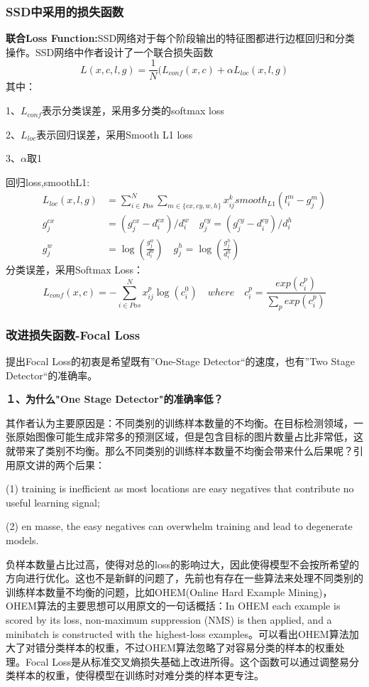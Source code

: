 \subsubsection{SSD中采用的损失函数}
\textbf{联合Loss Function:}SSD网络对于每个阶段输出的特征图都进行边框回归和分类操作。SSD网络中作者设计了一个联合损失函数
\begin{equation}
	L(x,c,l,g) = \frac{1}{N}(L_{conf}(x,c) + \alpha L_{loc}(x,l,g)
\end{equation}
其中：

 1、$L_{conf}$表示分类误差，采用多分类的softmax loss
 
 2、$L_{loc}$表示回归误差，采用Smooth L1 loss
 
 3、$\alpha$取1
 
回归loss,smoothL1:
\begin{align}
	L_{loc}(x,l,g) &= \sum _{i \in Pos} ^{N} \sum_{m \in \{cx,cy,w,h\}} x_{ij}^k smooth _{L1} (l_i ^m - g_j ^m) \\
	g_j^{cx} &= \left( g_j ^{cx} - d_i ^{cx} \right) / d_i ^w \quad g_j^{cy} = (g_j^{cy} - d_i^{cy}) / d_i ^h \\
	g_j^w &= \log(\frac{g_j^w}{d_i^w}) \quad g_j^h = \log(\frac{g_j^h}{d_i^h})
\end{align}	
分类误差，采用Softmax Loss：
\begin{equation}
L_{conf}(x, c) = -\sum_{i \in Pos}^N x_{ij}^p\log(c_i^0) \quad where \quad c_i^p = \frac{exp(c_i^p)}{\sum_{p}exp(c_i^p)} 
\end{equation}
\subsubsection{改进损失函数-Focal Loss}
提出Focal Loss的初衷是希望既有”One-Stage Detector“的速度，也有”Two Stage Detector“的准确率。

\textbf{１、为什么"One Stage Detector"的准确率低？}

其作者认为主要原因是：不同类别的训练样本数量的不均衡。在目标检测领域，一张原始图像可能生成非常多的预测区域，但是包含目标的图片数量占比非常低，这就带来了类别不均衡。那么不同类别的训练样本数量不均衡会带来什么后果呢？引用原文讲的两个后果：

(1) training is inefficient as most locations are easy negatives that contribute no useful learning signal; 

(2) en masse, the easy negatives can overwhelm training and lead to degenerate models. \cite{focal-loss}

负样本数量占比过高，使得对总的loss的影响过大，因此使得模型不会按所希望的方向进行优化。这也不是新鲜的问题了，先前也有存在一些算法来处理不同类别的训练样本数量不均衡的问题，比如OHEM(Online Hard Example Mining)\cite{ohem}，OHEM算法的主要思想可以用原文的一句话概括：In OHEM each example is scored by its loss, non-maximum suppression (NMS\cite{soft-nms}) is then applied, and a minibatch is constructed with the highest-loss examples。\cite{ohem}可以看出OHEM算法加大了对错分类样本的权重，不过OHEM算法忽略了对容易分类的样本的权重处理。Focal Loss是从标准交叉熵损失基础上改进所得。这个函数可以通过调整易分类样本的权重，使得模型在训练时对难分类的样本更专注。

